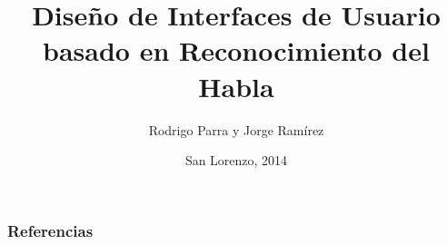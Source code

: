 \documentclass[compress]{beamer}
\title{Dise\~no de Interfaces de Usuario basado en Reconocimiento del Habla}
\author{Rodrigo Parra y Jorge Ram\'{i}rez}
\date{San Lorenzo, 2014}
\begin{document}
\frame{\titlepage}

\frame{\tableofcontents}

\justifying












\begin{frame}[allowframebreaks]
\frametitle{Referencias}


\end{frame}
\end{document}
